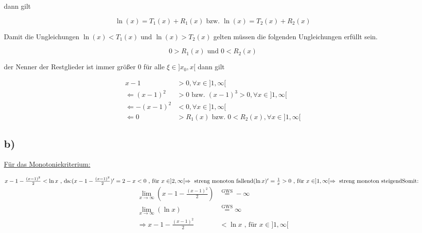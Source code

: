 \documentclass[a4paper, 11pt]{article}
\begin{document}
dann gilt

\begin{equation*}
    \ln(x) = T_1(x) + R_1(x) \text{ bzw. } \ln(x) = T_2(x) + R_2(x)
\end{equation*}

Damit die Ungleichungen \(\ln(x) < T_1(x)\) und \(\ln(x) > T_2(x)\) gelten
müssen die folgenden Ungleichungen erfüllt sein.

\begin{equation*}
    0 > R_1(x) \text{ und } 0 < R_2(x)
\end{equation*}

der Nenner der Restglieder ist immer größer 0 für alle \(\xi \in ]x_0, x[\)
dann gilt

\begin{align*}
    x - 1 &> 0, \forall x \in ]1, \infty[ \\
    \Leftarrow (x-1)^2 &> 0 \text{ bzw. } (x-1)^3 > 0, \forall x \in ]1, \infty[ \\
    \Leftarrow -(x-1)^2 &< 0, \forall x \in ]1, \infty[ \\
    \Leftarrow 0 &> R_1(x) \text{ bzw. } 0 < R_2(x), \forall x \in ]1, \infty[
\end{align*}

\subsection{b)}
\label{sec:org99020ee}
\uline{Für das Monotoniekriterium:} \newline

\begin{math}
x-1-\frac{(x-1)^2}{2} < \ln x \text{ , da:}
\newline
\newline
(x-1-\frac{(x-1)^2}{2})' = 2-x < 0 \text{ , für } x \in ]2, \infty[ \Rightarrow \text{ streng monoton fallend}
\newline
\newline
(\ln x)' = \frac{1}{x} > 0 \text{ , für } x \in ]1, \infty[ \Rightarrow \text{ streng monoton steigend}
\newline
\newline
\text{Somit: }
\end{math}
\begin{align*}
	\lim \limits_{x \to \infty}\left( x-1-\frac{(x-1)^2}{2}\right) &\overset{\text{GWS}}{=} -\infty \\
	\lim \limits_{x \to \infty}(\ln x) &\overset{\text{GWS}}{=} \infty \\
	\Rightarrow x-1-\frac{(x-1)^2}{2} &< \ln x \text{ , für } x \in ]1, \infty[
\end{align*}
\end{document}
